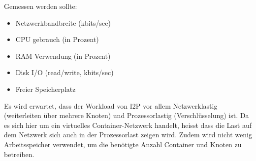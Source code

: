Gemessen werden sollte:

\begin{itemize}
    \item Netzwerkbandbreite (kbits/sec)
    \item CPU gebrauch (in Prozent)
    \item RAM Verwendung (in Prozent)
    \item Disk I/O (read/write, kbits/sec)
    \item Freier Speicherplatz
\end{itemize}

Es wird erwartet, dass der Workload von I2P vor allem Netzwerklastig (weiterleiten über mehrere Knoten) und Prozessorlastig (Verschlüsselung) ist.
Da es sich hier um ein virtuelles Container-Netzwerk handelt, heisst dass die Last auf dem Netzwerk sich auch in der Prozessorlast zeigen wird.
Zudem wird nicht wenig Arbeitsspeicher verwendet, um die benötigte Anzahl Container und Knoten zu betreiben.
